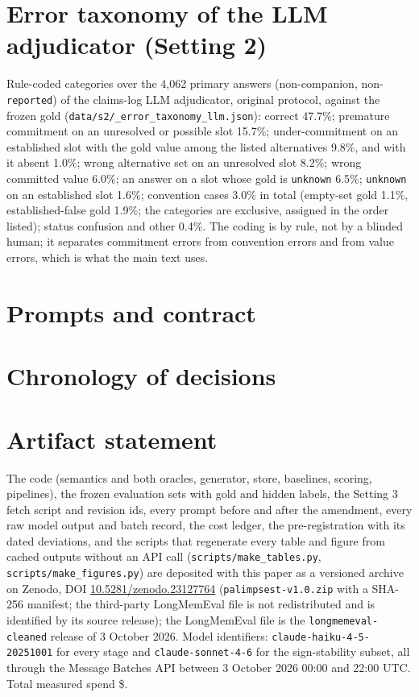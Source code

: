 \documentclass[11pt]{article}
\begin{document}
\section{Error taxonomy of the LLM adjudicator (Setting 2)}\label{app:errors}
Rule-coded categories over the 4{,}062 primary answers (non-companion, non-\texttt{reported}) of the claims-log LLM adjudicator, original protocol, against the frozen gold (\texttt{data/s2/\_error\_taxonomy\_llm.json}): correct 47.7\%; premature commitment on an unresolved or possible slot 15.7\%; under-commitment on an established slot with the gold value among the listed alternatives 9.8\%, and with it absent 1.0\%; wrong alternative set on an unresolved slot 8.2\%; wrong committed value 6.0\%; an answer on a slot whose gold is \texttt{unknown} 6.5\%; \texttt{unknown} on an established slot 1.6\%; convention cases 3.0\% in total (empty-set gold 1.1\%, established-false gold 1.9\%; the categories are exclusive, assigned in the order listed); status confusion and other 0.4\%. The coding is by rule, not by a blinded human; it separates commitment errors from convention errors and from value errors, which is what the main text uses.

\section{Prompts and contract}\label{app:prompts}


\section{Chronology of decisions}\label{app:chronology}


\section{Artifact statement}\label{app:artifacts}
The code (semantics and both oracles, generator, store, baselines, scoring, pipelines), the frozen evaluation sets with gold and hidden labels, the Setting 3 fetch script and revision ids, every prompt before and after the amendment, every raw model output and batch record, the cost ledger, the pre-registration with its dated deviations, and the scripts that regenerate every table and figure from cached outputs without an API call (\texttt{scripts/make\_tables.py}, \texttt{scripts/make\_figures.py}) are deposited with this paper as a versioned archive on Zenodo, DOI \href{https://doi.org/10.5281/zenodo.23127764}{10.5281/zenodo.23127764} (\texttt{palimpsest-v1.0.zip} with a SHA-256 manifest; the third-party LongMemEval file is not redistributed and is identified by its source release); the LongMemEval file is the \texttt{longmemeval-cleaned} release of 3 October 2026. Model identifiers: \texttt{claude-haiku-4-5-20251001} for every stage and \texttt{claude-sonnet-4-6} for the sign-stability subset, all through the Message Batches API between 3 October 2026 00:00 and 22:00 UTC. Total measured spend \$\spendTotal.
\end{document}
